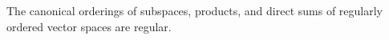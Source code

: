 The canonical orderings of subspaces, products, and direct sums of regularly ordered vector spaces are regular.

